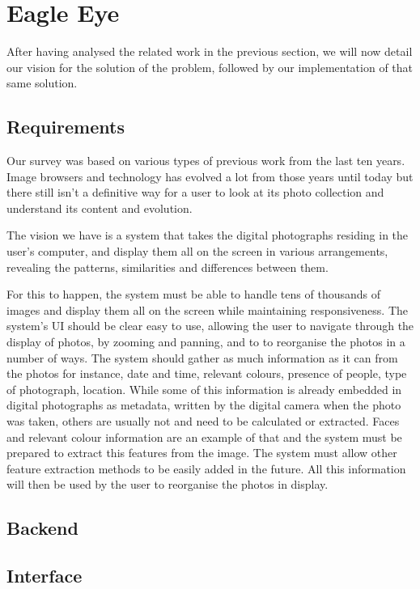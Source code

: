 \chapter{Eagle Eye}
\label{cha:eagle_eye}


After having analysed the related work in the previous section, we will now detail our vision for the solution of the problem, followed by our implementation of that same solution.


\section{Requirements}
\label{section:requirements}

Our survey was based on various types of previous work from the last ten years. Image browsers and technology has evolved a lot from those years until today but there still isn't a definitive way for a user to look at its photo collection and understand its content and evolution. 

The vision we have is a system that takes the digital photographs residing in the user's computer, and display them all on the screen in various arrangements, revealing the patterns, similarities and differences between them.

For this to happen, the system must be able to handle tens of thousands of images and display them all on the screen while maintaining responsiveness. The system's \ac{UI} should be clear easy to use, allowing the user to navigate through the display of photos, by zooming and panning, and to to reorganise the photos in a number of ways.
The system should gather as much information as it can from the photos for instance, date and time, relevant colours, presence of people, type of photograph, location. While some of this information is already embedded in digital photographs as metadata, written by the digital camera when the photo was taken, others are usually not and need to be calculated or extracted. Faces and relevant colour information are an example of that and the system must be prepared to extract this features from the image. The system must allow other feature extraction methods to be easily added in the future. All this information will then be used by the user to reorganise the photos in display.


\section{Backend} %
\label{sec:backend}





\section{Interface} %
\label{sec:interface}



\cleardoublepage